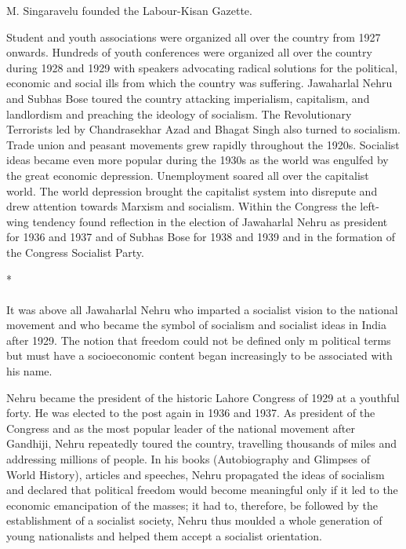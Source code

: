 M. Singaravelu founded the Labour-Kisan Gazette. 

Student and youth associations were organized all over the country from 1927 onwards. Hundreds of youth conferences were organized all over the country during 1928 and 1929 with speakers advocating radical solutions for the political, economic and social ills from which the country was suffering. Jawaharlal Nehru and Subhas Bose toured the country attacking imperialism, capitalism, and landlordism and preaching the ideology of socialism. The Revolutionary Terrorists led by Chandrasekhar Azad and Bhagat Singh also turned to socialism. Trade union and peasant movements grew rapidly throughout the 1920s. Socialist ideas became even more popular during the 1930s as the world was engulfed by the great economic depression. Unemployment soared all over the capitalist world. The world depression brought the capitalist system into disrepute and drew attention towards Marxism and socialism. Within the Congress the left-wing tendency found reflection in the election of Jawaharlal Nehru as president for 1936 and 1937 and of Subhas Bose for 1938 and 1939 and in the formation of the Congress Socialist Party.

\begin{center}*\end{center}

\paragraph*{}


It was above all Jawaharlal Nehru who imparted a socialist vision to the national movement and who became the symbol of socialism and socialist ideas in India after 1929. The notion that freedom could not be defined only m political terms but must have a socioeconomic content began increasingly to be associated with his name. 

Nehru became the president of the historic Lahore Congress of 1929 at a youthful forty. He was elected to the post again in 1936 and 1937. As president of the Congress and as the most popular leader of the national movement after Gandhiji, Nehru repeatedly toured the country, travelling thousands of miles and addressing millions of people. In his books (Autobiography and Glimpses of World History), articles and speeches, Nehru propagated the ideas of socialism and declared that political freedom would become meaningful only if it led to the economic emancipation of the masses; it had to, therefore, be followed by the establishment of a socialist society, Nehru thus moulded a whole generation of young nationalists and helped them accept a socialist orientation. 

